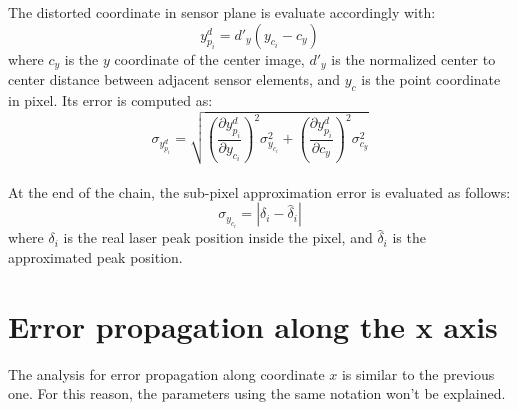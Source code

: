 The distorted coordinate in sensor plane is evaluate accordingly with:
  \begin{equation}
      \label{app:eq:sensor_to_camera_center}
      y_{p_i}^d = d'_y (y_{c_i} - c_y)
  \end{equation}
where $c_y$ is the $y$ coordinate of the center image, $d'_y$ is the normalized center to center distance between adjacent sensor elements, and $y_c$ is the point coordinate in pixel. Its error is computed as:
  \begin{equation*}
    \sigma_{y_{p_i}^d} = \sqrt{
      \left( \frac{\partial y_{p_i}^d}{\partial y_{c_i}} \right)^2 \sigma_{y_{c_i}}^2
      + \left( \frac{\partial y_{p_i}^d}{\partial c_y} \right)^2 \sigma_{c_y}^2
    }
  \end{equation*} \\

At the end of the chain, the sub-pixel approximation error is evaluated as follows:
  \begin{equation*}
    \sigma_{y_{c_i}} = |\delta_i - \hat{\delta}_i|
  \end{equation*}
where $\delta_i$ is the real laser peak position inside the pixel, and $\hat{\delta}_i$ is the approximated peak position.

\section*{Error propagation along the x axis}
The analysis for error propagation along coordinate $x$ is similar to the previous one. For this reason, the parameters using the same notation won't be explained. \\

